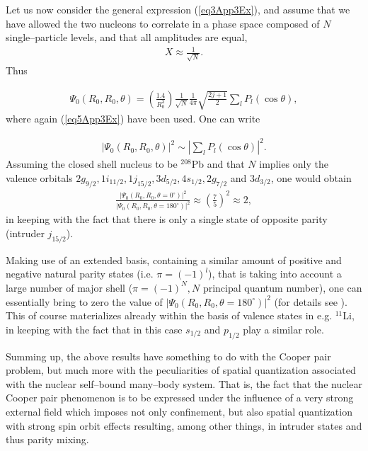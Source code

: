 \begin{subappendices}
Let us now consider the general expression (\ref{eq3App3Ex}), and assume that we have allowed the two nucleons to correlate in a phase space composed of $N$ single--particle levels, and that all amplitudes are equal,
 \begin{align}\label{eq8App3E}
X\approx\frac{1}{\sqrt{N}}.
 \end{align}
Thus 

 \begin{align}\label{eq9App3E}
\Psi_0(R_0,R_0,\theta)
=\left(\frac{1.4}{R_0^3}\right)\frac{1}{\sqrt{N}}\frac{1}{4\pi}\sqrt{\frac{2j+1}{2}}\sum_lP_l(\cos\theta),
 \end{align}
where again (\ref{eq5App3Ex}) have been used. One can write 

\begin{align}\label{eq10App3E}
|\Psi_0(R_0,R_0,\theta)|^2\sim |\sum_lP_l(\cos\theta)|^2.
\end{align}
Assuming the closed shell nucleus to be $^{208}$Pb and that $N$ implies only the valence orbitals $2g_{9/2},1i_{11/2},1j_{15/2},3d_{5/2},4s_{1/2},2g_{7/2}$ and $3d_{3/2}$, one would obtain
\begin{align}\label{eq11App3E}
\frac{|\Psi_0(R_0,R_0,\theta=0^\circ)|^2}{|\Psi_0(R_0,R_0,\theta=180^\circ)|^2}\approx\left(\frac{7}{5}\right)^2\approx2,
\end{align}
in keeping with the fact that there is only a single state of opposite parity (intruder $j_{15/2}$).

Making use of an extended basis, containing a similar amount of positive and negative natural parity states (i.e. $\pi=(-1)^l$), that is taking into account a large number of major shell ($\pi=(-1)^N, N$ principal quantum number), one can essentially bring to zero the value of $|\Psi_0(R_0,R_0,\theta=180^\circ)|^2$ (for details see \cite{Ferreira:84}).
This of course materializes already within the basis of valence states in e.g. $^{11}$Li, in keeping with the fact that in this case $s_{1/2}$ and $p_{1/2}$ play a similar role. 


Summing up, the above results have something to do with the Cooper pair problem, but much more with the peculiarities of spatial quantization associated with the nuclear self--bound many--body system. That is, the fact that the nuclear Cooper pair phenomenon  is to be expressed under the influence of a very strong external field which imposes not only confinement, but also spatial quantization with strong spin orbit effects resulting, among other things, in intruder states and thus parity mixing.   






\end{subappendices}



\clearpage
\newpage
















 
%
%

